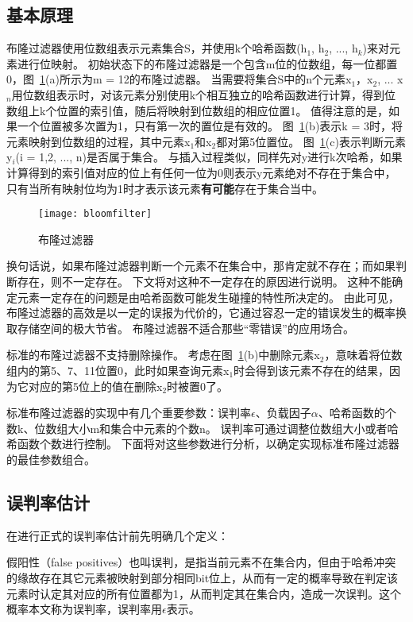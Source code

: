 \subsection{基本原理}
布隆过滤器使用位数组表示元素集合S，并使用k个哈希函数(h$_1$, h$_2$, ..., h$_k$)来对元素进行位映射。
初始状态下的布隆过滤器是一个包含m位的位数组，每一位都置0，图~\ref{fig:bf}(a)所示为m = 12的布隆过滤器。
当需要将集合S中的n个元素x$_1$，x$_2$, ... x$_n$用位数组表示时，对该元素分别使用k个相互独立的哈希函数进行计算，得到位数组上k个位置的索引值，随后将映射到位数组的相应位置1。
值得注意的是，如果一个位置被多次置为1，只有第一次的置位是有效的。
图~\ref{fig:bf}(b)表示k = 3时，将元素映射到位数组的过程，其中元素x$_1$和x$_2$都对第5位置位。
图~\ref{fig:bf}(c)表示判断元素y$_i$(i = 1,2, ..., n)是否属于集合。
与插入过程类似，同样先对y进行k次哈希，如果计算得到的索引值对应的位上有任何一位为0则表示y元素绝对不存在于集合中，只有当所有映射位均为1时才表示该元素\textbf{有可能}存在于集合当中。

\begin{figure}[htbp]
\centering
\texttt{[image: bloomfilter]}
\caption{布隆过滤器}\label{fig:bf}
\end{figure}

换句话说，如果布隆过滤器判断一个元素不在集合中，那肯定就不存在；而如果判断存在，则不一定存在。
下文将对这种不一定存在的原因进行说明。
这种不能确定元素一定存在的问题是由哈希函数可能发生碰撞的特性所决定的。
由此可见，布隆过滤器的高效是以一定的误报为代价的，它通过容忍一定的错误发生的概率换取存储空间的极大节省。
布隆过滤器不适合那些“零错误”的应用场合。

标准的布隆过滤器不支持删除操作。
考虑在图~\ref{fig:bf}(b)中删除元素x$_2$，意味着将位数组内的第5、7、11位置0，此时如果查询元素x$_1$时会得到该元素不存在的结果，因为它对应的第5位上的值在删除x$_2$时被置0了。

标准布隆过滤器的实现中有几个重要参数：误判率\begin{math}\epsilon\end{math}、负载因子\begin{math}\alpha\end{math}、哈希函数的个数k、位数组大小m和集合中元素的个数n。
误判率可通过调整位数组大小或者哈希函数个数进行控制。
下面将对这些参数进行分析，以确定实现标准布隆过滤器的最佳参数组合。

\subsection{误判率估计}
在进行正式的误判率估计前先明确几个定义：
\begin{definition}
	假阳性（false positives）也叫误判，是指当前元素不在集合内，但由于哈希冲突的缘故存在其它元素被映射到部分相同bit位上，从而有一定的概率导致在判定该元素时认定其对应的所有位置都为1，从而判定其在集合内，造成一次误判。这个概率本文称为误判率，误判率用$\epsilon$表示。
\end{definition}

